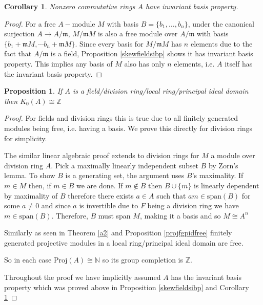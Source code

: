 \documentclass[12pt]{report}
\numberwithin{equation}{section}
\newcommand{\Z}{\mathbb{Z}}
\newcommand{\N}{\mathbb{N}}
\newcounter{dummy} \numberwithin{dummy}{section}
\newtheorem{corollary}[dummy]{Corollary}
\newtheorem{proposition}[dummy]{Proposition}
\begin{document}
	\begin{corollary}\label{comringibp}
		Nonzero commutative rings $A$ have invariant basis property.
	\end{corollary}
	\begin{proof}
		For a free $A-$module $M $ with basis $B=\{b_1, \ldots, b_n\}$, under the canonical surjection $A \to A/\mathfrak{m}$, $M/\mathfrak{m}M$ is also a free module over $A/\mathfrak{m}$ with basis $\{b_1+\mathfrak{m} M, \cdots b_n + \mathfrak{m}M\}$. Since every basis for $M/\mathfrak{m}M$ has $n$ elements due to the fact that $A/\mathfrak{m}$ is a field, Proposition \ref{skewfieldsibp} shows it has invariant basis property. This implies any basis of $M$ also has only $n$ elements, i.e. $A$ itself has the invariant basis property.
	\end{proof}
	\begin{proposition}\label{k0pidisZ}
	If $A$ is a field/division ring/local ring/principal ideal domain then $K_0(A)\cong\Z$
	\end{proposition}
	\begin{proof}
		For fields and division rings this is true due to all finitely generated modules being free, i.e. having a basis. We prove this directly for division rings for simplicity.
		
		The similar linear algebraic proof extends to division rings for $M$ a module over division ring $A$. Pick a maximally linearly independent subset $B$ by Zorn's lemma. To show \( B \) is a generating set, the argument uses \( B \)'s maximality. If \( m \in M \) then, if $m \in B$ we are done. If $m \not \in B$ then $B \cup \{m\}$ is linearly dependent by maximality of $B$ therefore there exists $a\in A$ such that $am \in \mathrm{span}(B)$ for some $a \neq 0$ and since $a $ is invertible due to $F$ being a division ring we have $m \in \mathrm{span}(B)$.
		Therefore, \( B \) must span \( M \), making it a basis and so $ M \cong A^n$
		
		Similarly as seen in Theorem \ref{a2} and  Proposition \ref{projfgpidfree} finitely generated projective modules in a local ring/principal ideal domain are free.
		
		So in each case $\mathrm{Proj}(A) \cong \N$ so its group completion is $\Z.$ 
		
		Throughout the proof we have implicitly assumed $A$ has the invariant basis property which was proved above in Proposition \ref{skewfieldsibp} and Corollary \ref{comringibp}
		\end{proof}
		
\end{document}
